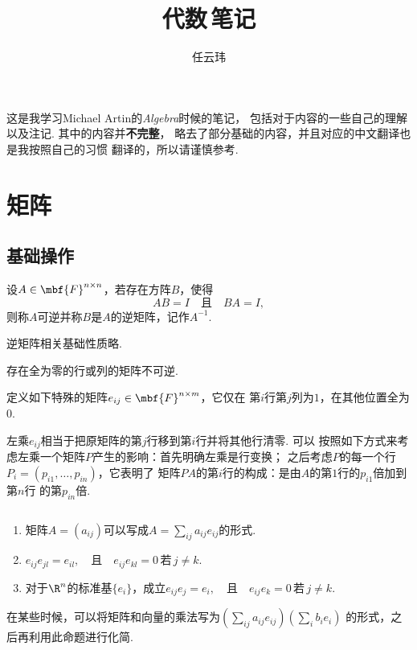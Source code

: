 

\title{代数$\,$笔记}
\author{任云玮}
\date{}


\maketitle
\tableofcontents
\newpage

  这是我学习Michael Artin的\textit{Algebra}时候的笔记，
  包括对于内容的一些自己的理解以及注记. 其中的内容并\textbf{不完整}，
  略去了部分基础的内容，并且对应的中文翻译也是我按照自己的习惯
  翻译的，所以请谨慎参考.

\section{矩阵}
\subsection{基础操作}

  \begin{defi}[逆]
    设$A\in\mbf{F}^{n\times n}$，若存在方阵$B$，使得
    \begin{equation*}
      AB=I \quad \text{且} \quad BA=I,
    \end{equation*}
    则称$A$可逆并称$B$是$A$的逆矩阵，记作$A^{-1}$.
  \end{defi}
  \remark
    逆矩阵相关基础性质略.

  \begin{lemma}[不可逆]
    存在全为零的行或列的矩阵不可逆.
  \end{lemma}

  \begin{defi}
    \label{defi: 矩阵元}
    定义如下特殊的矩阵$e_{ij}\in\mbf{F}^{n\times m}$，它仅在
    第$i$行第$j$列为$1$，在其他位置全为$0$.
  \end{defi}
  \remark
    左乘$e_{ij}$相当于把原矩阵的第$j$行移到第$i$行并将其他行清零. 可以
    按照如下方式来考虑左乘一个矩阵$P$产生的影响：首先明确左乘是行变换；
    之后考虑$P$的每一个行$P_i = (p_{i1},\dots,p_{in})$，它表明了
    矩阵$PA$的第$i$行的构成：是由$A$的第$1$行的$p_{i1}$倍加到第$n$行
    的第$p_{in}$倍.

  \begin{pos}[矩阵元的性质]
    $\,$
    \begin{enumerate}
      \item 矩阵$A=(a_{ij})$可以写成$A=\sum_{ij}a_{ij}e_{ij}$的形式.
      \item $e_{ij}e_{jl} = e_{il},\quad\text{且}\quad e_{ij}e_{kl}=0
            \,\text{若}\,j\ne k$.
      \item 对于$\R^n$的标准基$\{e_i\}$，成立$e_{ij}e_j=e_i,\quad\text{且}
            \quad e_{ij}e_k=0\,\text{若}\, j\ne k$.
    \end{enumerate}
  \end{pos}
  \remark
    在某些时候，可以将矩阵和向量的乘法写为$(\sum_{ij}a_{ij}e_{ij})(\sum_ib_ie_i)$
    的形式，之后再利用此命题进行化简.

